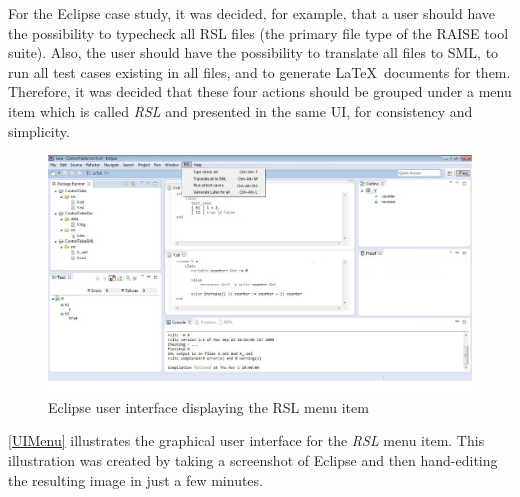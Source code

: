 \documentclass[conference]{IEEEtran}
\begin{document}
For the Eclipse case study, it was decided, for example, that a user
should have the possibility to typecheck all RSL files (the primary
file type of the RAISE tool suite). Also, the user should have the
possibility to translate all files to SML, to run all test cases
existing in all files, and to generate \LaTeX\ documents for them.
Therefore, it was decided that these four actions should be grouped
under a menu item which is called \emph{RSL} and presented in the same
UI, for consistency and simplicity.


\begin{figure}[ht!] \centering
\includegraphics[width=7in]{RSLMenu.jpeg} 
\caption{Eclipse user interface displaying the RSL menu item} 
\label{UIMenu} 
\end{figure}


\autoref{UIMenu} illustrates the graphical user interface for the
\emph{RSL} menu item.  This illustration was created by taking a
screenshot of Eclipse and then hand-editing the resulting image in
just a few minutes.


\end{document}
